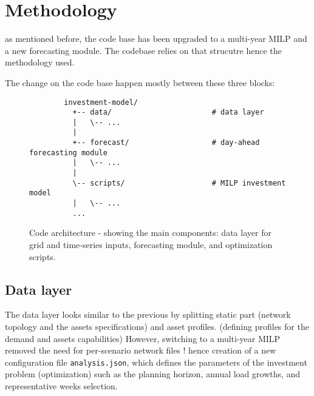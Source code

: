 \newpage
\section{Methodology}

as mentioned before, the code base has been upgraded to a multi-year MILP and a new
forecasting module. The codebase relies on that strucutre hence the methodology used.

The change on the code base happen mostly between these three blocks:
\begin{figure}[h!]
  \centering
    \begin{verbatim}
        investment-model/
          +-- data/                       # data layer
          |   \-- ...
          |
          +-- forecast/                   # day-ahead forecasting module
          |   \-- ...
          |
          \-- scripts/                    # MILP investment model
          |   \-- ...
          ...
    \end{verbatim}
  \caption{Code architecture - showing the main components: data layer for grid and time-series inputs, forecasting module, and optimization scripts.}
  \label{fig:code-arch}
\end{figure}

\subsection{Data layer}
\label{sec:data-layer}

The data layer looks similar to the previous by splitting static part (network topology and the assets specifications)
and asset profiles. (defining profiles for the demand and assets capabilities) 
However, switching to a multi-year MILP removed the need for per-scenario network files !
hence creation of a new configuration file \texttt{analysis.json}, which defines the parameters of the investment problem (optimization) 
such as the planning horizon, annual load growths, and representative weeks selection.

